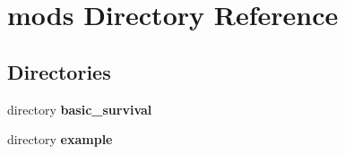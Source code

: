 \section{mods Directory Reference}
\label{dir_e32e21dff86b2f4c3e9cf44f437b74cb}
\subsection*{Directories}
\begin{DoxyCompactItemize}
\item 
directory {\bf basic\+\_\+survival}
\item 
directory {\bf example}
\end{DoxyCompactItemize}
